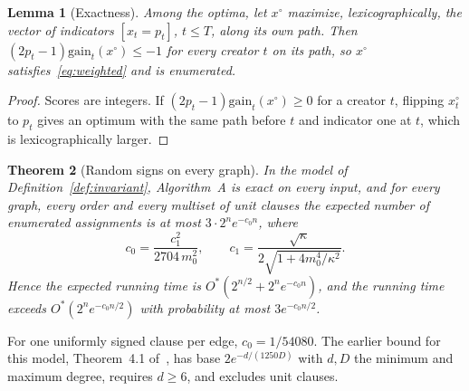 \documentclass[11pt,a4paper]{article}
\newtheorem{theorem}{Theorem}
\newtheorem{lemma}[theorem]{Lemma}
\theoremstyle{definition}
\theoremstyle{remark}
\newcommand{\Ostar}{O^{*}}
\begin{document}
\begin{lemma}[Exactness]\label{lem:exactA}
Among the optima, let $x^\circ$ maximize, lexicographically, the vector of
indicators $[x_t=p_t]$, $t\le T$, along its own path. Then
$(2p_t-1)\mathrm{gain}_t(x^\circ)\le-1$ for every creator $t$ on its path, so
$x^\circ$ satisfies~\eqref{eq:weighted} and is enumerated.
\end{lemma}
\begin{proof}
Scores are integers. If $(2p_t-1)\mathrm{gain}_t(x^\circ)\ge0$ for a creator $t$,
flipping $x^\circ_t$ to $p_t$ gives an optimum with the same path before $t$ and
indicator one at $t$, which is lexicographically larger.
\end{proof}

\begin{theorem}[Random signs on every graph]\label{thm:weighted}
In the model of Definition~\ref{def:invariant}, Algorithm~A is exact on every
input, and for every graph, every order and every multiset of unit clauses the
expected number of enumerated assignments is at most $3\cdot2^ne^{-c_0n}$, where
\[
 c_0=\frac{c_1^2}{2704\,m_0^2},\qquad
 c_1=\frac{\sqrt\kappa}{2\sqrt{1+4m_0^4/\kappa^2}}.
\]
Hence the expected running time is $\Ostar(2^{n/2}+2^ne^{-c_0n})$, and the
running time exceeds $\Ostar(2^ne^{-c_0n/2})$ with probability at most
$3e^{-c_0n/2}$.
\end{theorem}

For one uniformly signed clause per edge, $c_0=1/54080$. The earlier bound for
this model, Theorem~4.1 of~\cite{Paper}, has base $2e^{-d/(1250D)}$ with $d,D$
the minimum and maximum degree, requires $d\ge6$, and excludes unit clauses.
\end{document}
